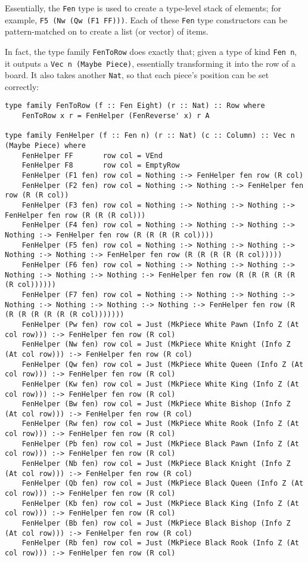 \documentclass[12pt, a4paper, bibliography=totocnumbered]{scrreprt}
\newcommand{\inline}[1]{\lstinline[basicstyle=\ttfamily\footnotesize]{#1}}
\begin{document}
Essentially, the \inline{Fen} type is used to create a type-level stack of elements; for example, \inline{F5 (Nw (Qw (F1 FF)))}. Each of these \inline{Fen} type constructors can be pattern-matched on to create a list (or vector) of items.

In fact, the type family \inline{FenToRow} does exactly that; given a type of kind \inline{Fen n}, it outputs a \inline{Vec n (Maybe Piece)}, essentially transforming it into the row of a board. It also takes another \inline{Nat}, so that each piece's position can be set correctly:

\begin{lstlisting}
type family FenToRow (f :: Fen Eight) (r :: Nat) :: Row where
    FenToRow x r = FenHelper (FenReverse' x) r A

type family FenHelper (f :: Fen n) (r :: Nat) (c :: Column) :: Vec n (Maybe Piece) where
    FenHelper FF       row col = VEnd
    FenHelper F8       row col = EmptyRow
    FenHelper (F1 fen) row col = Nothing :-> FenHelper fen row (R col)
    FenHelper (F2 fen) row col = Nothing :-> Nothing :-> FenHelper fen row (R (R col))
    FenHelper (F3 fen) row col = Nothing :-> Nothing :-> Nothing :-> FenHelper fen row (R (R (R col)))
    FenHelper (F4 fen) row col = Nothing :-> Nothing :-> Nothing :-> Nothing :-> FenHelper fen row (R (R (R (R col))))
    FenHelper (F5 fen) row col = Nothing :-> Nothing :-> Nothing :-> Nothing :-> Nothing :-> FenHelper fen row (R (R (R (R (R col)))))
    FenHelper (F6 fen) row col = Nothing :-> Nothing :-> Nothing :-> Nothing :-> Nothing :-> Nothing :-> FenHelper fen row (R (R (R (R (R (R col))))))
    FenHelper (F7 fen) row col = Nothing :-> Nothing :-> Nothing :-> Nothing :-> Nothing :-> Nothing :-> Nothing :-> FenHelper fen row (R (R (R (R (R (R (R col)))))))
    FenHelper (Pw fen) row col = Just (MkPiece White Pawn (Info Z (At col row))) :-> FenHelper fen row (R col)
    FenHelper (Nw fen) row col = Just (MkPiece White Knight (Info Z (At col row))) :-> FenHelper fen row (R col)
    FenHelper (Qw fen) row col = Just (MkPiece White Queen (Info Z (At col row))) :-> FenHelper fen row (R col)
    FenHelper (Kw fen) row col = Just (MkPiece White King (Info Z (At col row))) :-> FenHelper fen row (R col)
    FenHelper (Bw fen) row col = Just (MkPiece White Bishop (Info Z (At col row))) :-> FenHelper fen row (R col)
    FenHelper (Rw fen) row col = Just (MkPiece White Rook (Info Z (At col row))) :-> FenHelper fen row (R col)
    FenHelper (Pb fen) row col = Just (MkPiece Black Pawn (Info Z (At col row))) :-> FenHelper fen row (R col)
    FenHelper (Nb fen) row col = Just (MkPiece Black Knight (Info Z (At col row))) :-> FenHelper fen row (R col)
    FenHelper (Qb fen) row col = Just (MkPiece Black Queen (Info Z (At col row))) :-> FenHelper fen row (R col)
    FenHelper (Kb fen) row col = Just (MkPiece Black King (Info Z (At col row))) :-> FenHelper fen row (R col)
    FenHelper (Bb fen) row col = Just (MkPiece Black Bishop (Info Z (At col row))) :-> FenHelper fen row (R col)
    FenHelper (Rb fen) row col = Just (MkPiece Black Rook (Info Z (At col row))) :-> FenHelper fen row (R col)
\end{lstlisting}
\end{document}
